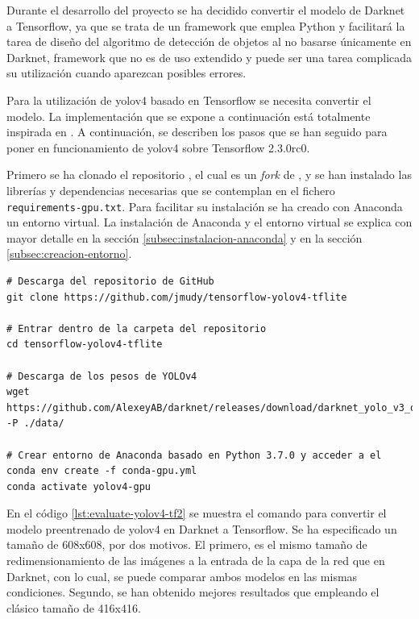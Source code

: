 Durante el desarrollo del proyecto se ha decidido convertir el modelo de Darknet a Tensorflow, ya que se trata de un framework que emplea Python y facilitará la tarea de diseño del algoritmo de detección de objetos al no basarse únicamente en Darknet, framework que no es de uso extendido y puede ser una tarea complicada su utilización cuando aparezcan posibles errores.

Para la utilización de \gls{yolov4} basado en Tensorflow se necesita convertir el modelo. La implementación que se expone a continuación está totalmente inspirada en \cite{yolov4-tf-github-original}. A continuación, se describen los pasos que se han seguido para poner en funcionamiento de \gls{yolov4} sobre Tensorflow 2.3.0rc0.

Primero se ha clonado el repositorio \cite{yolov4-tf-github}, el cual es un \textit{fork} de \cite{yolov4-tf-github-original}, y se han instalado las librerías y dependencias necesarias que se contemplan en el fichero \texttt{requirements-gpu.txt}. Para facilitar su instalación se ha creado con Anaconda un entorno virtual. La instalación de Anaconda y el entorno virtual se explica con mayor detalle en la sección \ref{subsec:instalacion-anaconda} y en la sección \ref{subsec:creacion-entorno}.

\vspace{0.5cm}
\begin{lstlisting}[language=iPython,caption=Evaluación del detector de objetos YOLOv4 en Tensorflow (1),captionpos=b,label={lst:evaluate-yolov4-tf1}]
# Descarga del repositorio de GitHub
git clone https://github.com/jmudy/tensorflow-yolov4-tflite

# Entrar dentro de la carpeta del repositorio
cd tensorflow-yolov4-tflite

# Descarga de los pesos de YOLOv4
wget https://github.com/AlexeyAB/darknet/releases/download/darknet_yolo_v3_optimal/yolov4.weights -P ./data/

# Crear entorno de Anaconda basado en Python 3.7.0 y acceder a el
conda env create -f conda-gpu.yml
conda activate yolov4-gpu
\end{lstlisting}

En el código \ref{lst:evaluate-yolov4-tf2} se muestra el comando para convertir el modelo preentrenado de \gls{yolov4} en Darknet a Tensorflow. Se ha especificado un tamaño de 608x608, por dos motivos. El primero, es el mismo tamaño de redimensionamiento de las imágenes a la entrada de la capa de la red que en Darknet, con lo cual, se puede comparar ambos modelos en las mismas condiciones. Segundo, se han obtenido mejores resultados que empleando el clásico tamaño de 416x416.

